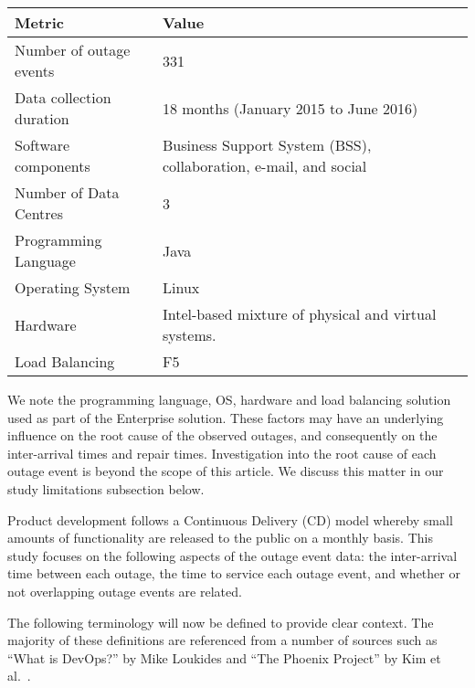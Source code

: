 \documentclass[5p]{elsarticle}
\begin{document}
\begin {table*}[]
\caption {Summary of dataset metrics and factors} 
\label{tab:dataset}
\begin{center}
\begin{tabular}{p{4cm} |  p{11cm}} \hline \bf{Metric} & \bf{Value}
\\ \hline Number of outage events & 331 
\\ Data collection duration & 18 months (January 2015 to June 2016) 
\\ Software components & Business Support System (BSS), collaboration, e-mail, and social  	
\\ Number of Data Centres & 3 
\\ Programming Language & Java 
\\ Operating System & Linux 
\\ Hardware & Intel-based mixture of physical and virtual systems.
\\ Load Balancing & F5
\\ \hline
\end{tabular}
\end{center}
\end{table*}

We note the programming language, OS, hardware and load balancing solution used as part of the Enterprise solution. These factors may have an underlying influence on the root cause of the observed outages, and consequently on the inter-arrival times and repair times. Investigation into the root cause of each outage event is beyond the scope of this article. We discuss this matter in our study limitations subsection below.

Product development follows a Continuous Delivery (CD) model whereby small amounts of functionality are released to the public on a monthly basis. This study focuses on the following aspects of the outage event data: the inter-arrival time between each outage, the time to service each outage event, and whether or not overlapping outage events are related.

The following terminology will now be defined to provide clear context. The majority of these definitions are referenced from a number of sources such as ``What is DevOps?'' by Mike Loukides \cite{loukides2012devops} and ``The Phoenix Project'' by Kim et al.~\cite{kim2014phoenix}.
\end{document}
